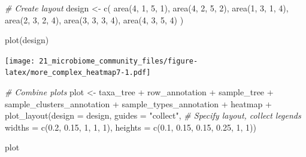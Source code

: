 \documentclass[
]{book}
\newenvironment{Shaded}{\begin{snugshade}}{\end{snugshade}}
\newcommand{\AttributeTok}[1]{\textcolor[rgb]{0.77,0.63,0.00}{#1}}
\newcommand{\CommentTok}[1]{\textcolor[rgb]{0.56,0.35,0.01}{\textit{#1}}}
\newcommand{\DecValTok}[1]{\textcolor[rgb]{0.00,0.00,0.81}{#1}}
\newcommand{\FloatTok}[1]{\textcolor[rgb]{0.00,0.00,0.81}{#1}}
\newcommand{\FunctionTok}[1]{\textcolor[rgb]{0.00,0.00,0.00}{#1}}
\newcommand{\NormalTok}[1]{#1}
\newcommand{\OtherTok}[1]{\textcolor[rgb]{0.56,0.35,0.01}{#1}}
\newcommand{\SpecialCharTok}[1]{\textcolor[rgb]{0.00,0.00,0.00}{#1}}
\newcommand{\StringTok}[1]{\textcolor[rgb]{0.31,0.60,0.02}{#1}}
\begin{document}
\begin{Shaded}
\begin{Highlighting}[]
\CommentTok{\# Create layout}
\NormalTok{design }\OtherTok{\textless{}{-}} \FunctionTok{c}\NormalTok{(}
  \FunctionTok{area}\NormalTok{(}\DecValTok{4}\NormalTok{, }\DecValTok{1}\NormalTok{, }\DecValTok{5}\NormalTok{, }\DecValTok{1}\NormalTok{),}
  \FunctionTok{area}\NormalTok{(}\DecValTok{4}\NormalTok{, }\DecValTok{2}\NormalTok{, }\DecValTok{5}\NormalTok{, }\DecValTok{2}\NormalTok{),}
  \FunctionTok{area}\NormalTok{(}\DecValTok{1}\NormalTok{, }\DecValTok{3}\NormalTok{, }\DecValTok{1}\NormalTok{, }\DecValTok{4}\NormalTok{),}
  \FunctionTok{area}\NormalTok{(}\DecValTok{2}\NormalTok{, }\DecValTok{3}\NormalTok{, }\DecValTok{2}\NormalTok{, }\DecValTok{4}\NormalTok{),}
  \FunctionTok{area}\NormalTok{(}\DecValTok{3}\NormalTok{, }\DecValTok{3}\NormalTok{, }\DecValTok{3}\NormalTok{, }\DecValTok{4}\NormalTok{),}
  \FunctionTok{area}\NormalTok{(}\DecValTok{4}\NormalTok{, }\DecValTok{3}\NormalTok{, }\DecValTok{5}\NormalTok{, }\DecValTok{4}\NormalTok{)}
\NormalTok{)}

\FunctionTok{plot}\NormalTok{(design)}
\end{Highlighting}
\end{Shaded}

\texttt{[image: 21\_microbiome\_community\_files/figure-latex/more\_complex\_heatmap7-1.pdf]}

\begin{Shaded}
\begin{Highlighting}[]
\CommentTok{\# Combine plots}
\NormalTok{plot }\OtherTok{\textless{}{-}}\NormalTok{ taxa\_tree }\SpecialCharTok{+} 
\NormalTok{  row\_annotation }\SpecialCharTok{+}
\NormalTok{  sample\_tree }\SpecialCharTok{+} 
\NormalTok{  sample\_clusters\_annotation }\SpecialCharTok{+}
\NormalTok{  sample\_types\_annotation }\SpecialCharTok{+}
\NormalTok{  heatmap }\SpecialCharTok{+}
    \FunctionTok{plot\_layout}\NormalTok{(}\AttributeTok{design =}\NormalTok{ design, }\AttributeTok{guides =} \StringTok{"collect"}\NormalTok{, }\CommentTok{\# Specify layout, collect legends}
                \AttributeTok{widths =} \FunctionTok{c}\NormalTok{(}\FloatTok{0.2}\NormalTok{, }\FloatTok{0.15}\NormalTok{, }\DecValTok{1}\NormalTok{, }\DecValTok{1}\NormalTok{, }\DecValTok{1}\NormalTok{),}
                \AttributeTok{heights =} \FunctionTok{c}\NormalTok{(}\FloatTok{0.1}\NormalTok{, }\FloatTok{0.15}\NormalTok{, }\FloatTok{0.15}\NormalTok{, }\FloatTok{0.25}\NormalTok{, }\DecValTok{1}\NormalTok{, }\DecValTok{1}\NormalTok{))}

\NormalTok{plot}
\end{Highlighting}
\end{Shaded}
\end{document}
